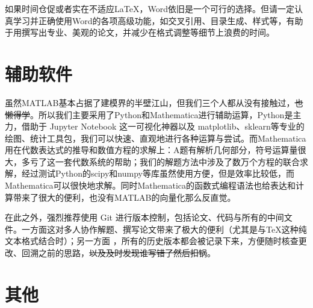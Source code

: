 \documentclass[fontset=adobe]{ctexart}
\begin{document}
如果时间仓促或者实在不适应\LaTeX{}，Word依旧是一个可行的选择。但请一定认真学习并正确使用Word的各项高级功能，如交叉引用、目录生成、样式等，有助于用撰写出专业、美观的论文，并减少在格式调整等细节上浪费的时间。

\section{辅助软件}
虽然MATLAB基本占据了建模界的半壁江山，但我们三个人都从没有接触过，\sout{也懒得学}。所以我们主要采用了Python和Mathematica进行辅助运算，Python是主力，借助于 Jupyter Notebook 这一可视化神器以及 matplotlib、sklearn等专业的绘图、统计工具包，我们可以快速、直观地进行各种运算与尝试。而Mathematica用在代数表达式的推导和数值方程的求解上：A题有解析几何部分，符号运算量很大，多亏了这一套代数系统的帮助；我们的解题方法中涉及了数万个方程的联合求解，经过测试Python的scipy和numpy等库虽然使用方便，但是效率比较低，而Mathematica可以很快地求解。同时Mathematica的函数式编程语法也给表达和计算带来了很大的便利，也没有MATLAB的向量化那么反直觉。

在此之外，强烈推荐使用 Git 进行版本控制，包括论文、代码与所有的中间文件。一方面这对多人协作解题、撰写论文带来了极大的便利（尤其是与\TeX{}这种纯文本格式结合时）；另一方面 ，所有的历史版本都会被记录下来，方便随时核查更改、回溯之前的思路，\sout{以及及时发现谁写错了然后扣锅}。

\section{其他}
\end{document}
